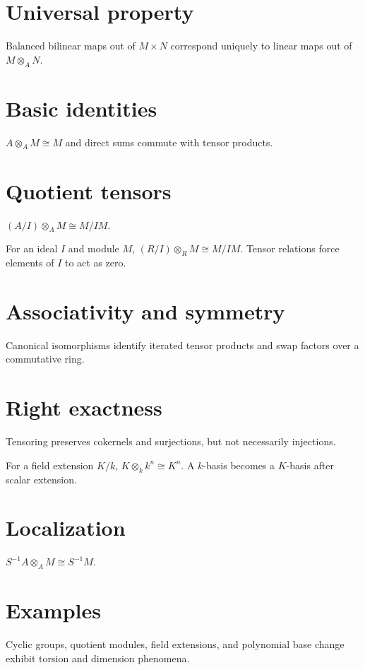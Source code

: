 \section{Universal property}
Balanced bilinear maps out of $M\times N$ correspond uniquely to linear maps out of $M\otimes_A N$.

\section{Basic identities}
$A\otimes_A M\cong M$ and direct sums commute with tensor products.

\section{Quotient tensors}
$(A/I)\otimes_A M\cong M/IM$.

\begin{example}\label{ex:v10-expand-02}
For an ideal $I$ and module $M$, $(R/I)\otimes_RM\cong M/IM$. Tensor relations force elements of $I$ to act as zero.
\end{example}
\section{Associativity and symmetry}
Canonical isomorphisms identify iterated tensor products and swap factors over a commutative ring.

\section{Right exactness}
Tensoring preserves cokernels and surjections, but not necessarily injections.

\begin{example}\label{ex:v10-expand-03}
For a field extension $K/k$, $K\otimes_k k^n\cong K^n$. A $k$-basis becomes a $K$-basis after scalar extension.
\end{example}
\section{Localization}
$S^{-1}A\otimes_A M\cong S^{-1}M$.

\section{Examples}
Cyclic groups, quotient modules, field extensions, and polynomial base change exhibit torsion and dimension phenomena.

